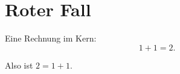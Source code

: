 \chapter{Roter Fall}\label{c99}

Eine Rechnung im Kern:
\begin{equation}\label{c99.eq.eins}
  1 + 1 = 2.
\end{equation}
\begin{corollary}
  Also ist $2 = 1 + 1$.
\end{corollary}
